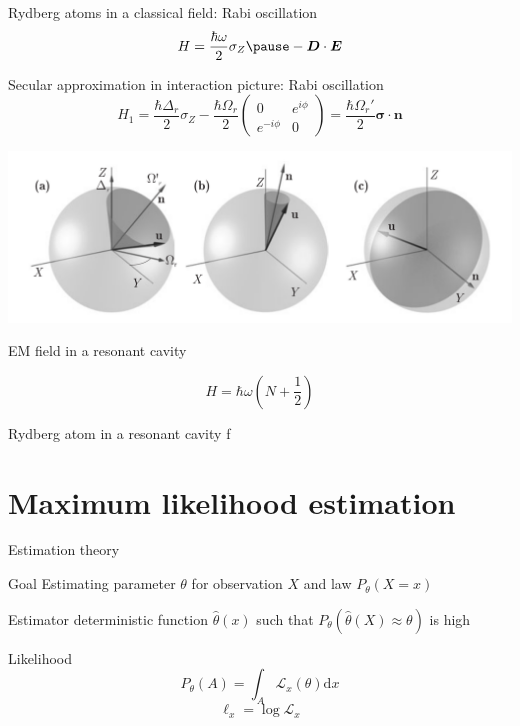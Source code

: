 \documentclass{beamer}
\newcommand{\dd}{\mathrm{d}}
\newcommand{\mat}[1]{\begin{pmatrix}#1\end{pmatrix}}
\newcommand{\bs}{\boldsymbol}
\begin{document}
\begin{frame}{Rydberg atoms in a classical field: Rabi oscillation}
  \[H = \frac{\hbar \omega}2 \sigma_Z \pause - \bs D \cdot \bs E\]

  \pause{}

  \begin{block}{Secular approximation in interaction picture: Rabi oscillation}
    \[H_1 = \frac{\hbar \Delta_r}2 \sigma_Z - \frac{\hbar \Omega_r}2
      \mat{0&e^{i\phi}\\e^{-i\phi}&0} = \frac{\hbar \Omega_r'}2 \bs \sigma
      \cdot \bs n\]
  \end{block}

  \pause{}

  \includegraphics[width=\textwidth]{Rabi.png}
\end{frame}

\begin{frame}{EM field in a resonant cavity}

  \[H = \hbar\omega \left(N +\frac12\right)\]
\end{frame}

\begin{frame}{Rydberg atom in a resonant cavity}
  f
\end{frame}



\section{Maximum likelihood estimation}

\begin{frame}{Estimation theory}

  \begin{block}{Goal}
    Estimating parameter $\theta$ for observation $X$ and law $P_\theta(X = x)$
  \end{block}

  \pause{}

  \begin{block}{Estimator}
    deterministic function $\hat \theta(x)$ such that $P_\theta(\hat \theta(X)
    \approx \theta)$ is high
  \end{block}

  \pause{}

  \begin{block}{Likelihood}
    \[P_\theta(A) = \int_A \mathcal{L}_x(\theta) \dd x\]
    \[\ell_x = \log \mathcal{L}_x\]
  \end{block}
  
\end{frame}
\end{document}

